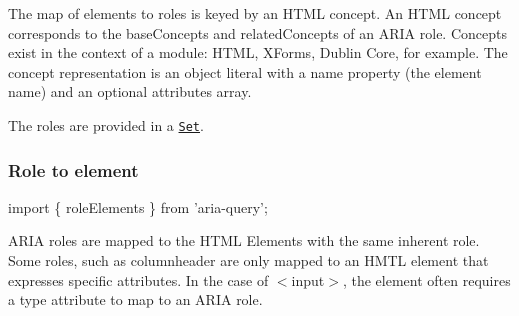 The map of elements to roles is keyed by an H\+T\+ML concept. An H\+T\+ML concept corresponds to the {\ttfamily base\+Concepts} and {\ttfamily related\+Concepts} of an A\+R\+IA role. Concepts exist in the context of a {\ttfamily module}\+: H\+T\+ML, X\+Forms, Dublin Core, for example. The concept representation is an object literal with a name property (the element name) and an optional attributes array.

The roles are provided in a \href{https://developer.mozilla.org/en-US/docs/Web/JavaScript/Reference/Global_Objects/Set}{\tt Set}.

\subsubsection*{Role to element}


\begin{DoxyCode}
import \{ roleElements \} from 'aria-query';
\end{DoxyCode}


A\+R\+IA roles are mapped to the H\+T\+ML Elements with the same inherent role. Some roles, such as {\ttfamily columnheader} are only mapped to an H\+M\+TL element that expresses specific attributes. In the case of {\ttfamily $<$input$>$}, the element often requires a {\ttfamily type} attribute to map to an A\+R\+IA role.


